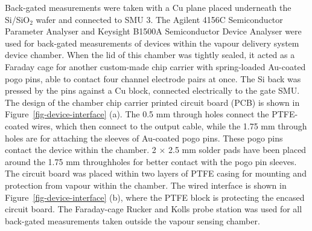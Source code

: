 \documentclass[
  a4paper,
]{scrbook}
\begin{document}
Back-gated measurements were taken with a Cu plane placed underneath the
Si/SiO\(_2\) wafer and connected to SMU 3. The Agilent 4156C
Semiconductor Parameter Analyser and Keysight B1500A Semiconductor
Device Analyser were used for back-gated measurements of devices within
the vapour delivery system device chamber. When the lid of this chamber
was tightly sealed, it acted as a Faraday cage for another custom-made
chip carrier with spring-loaded Au-coated pogo pins, able to contact
four channel electrode pairs at once. The Si back was pressed by the
pins against a Cu block, connected electrically to the gate SMU. The
design of the chamber chip carrier printed circuit board (PCB) is shown
in Figure~\ref{fig-device-interface} (a). The 0.5 mm through holes
connect the PTFE-coated wires, which then connect to the output cable,
while the 1.75 mm through holes are for attaching the sleeves of
Au-coated pogo pins. These pogo pins contact the device within the
chamber. 2 × 2.5 mm solder pads have been placed around the 1.75 mm
throughholes for better contact with the pogo pin sleeves. The circuit
board was placed within two layers of PTFE casing for mounting and
protection from vapour within the chamber. The wired interface is shown
in Figure~\ref{fig-device-interface} (b), where the PTFE block is
protecting the encased circuit board. The Faraday-cage Rucker and Kolls
probe station was used for all back-gated measurements taken outside the
vapour sensing chamber.
\end{document}
